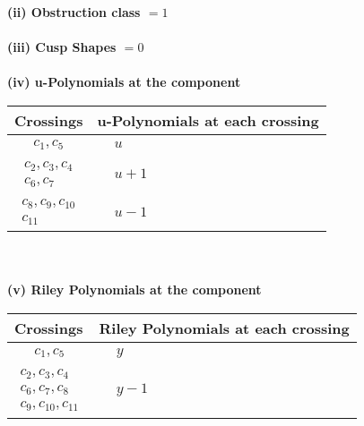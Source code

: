 \documentclass[1p]{elsarticle_modified}
\theoremstyle{definition}
\begin{document}
\flushleft \textbf{(ii) Obstruction class $= 1$}\\~\\
\flushleft \textbf{(iii) Cusp Shapes $= 0$}\\~\\
\newpage\renewcommand{\arraystretch}{1}
\flushleft \textbf{(iv) u-Polynomials at the component}\newline \\
\begin{tabular}{m{50pt}|m{274pt}}
Crossings & \hspace{64pt}u-Polynomials at each crossing \\
\hline $$\begin{aligned}c_{1},c_{5}\end{aligned}$$&$\begin{aligned}
&u
\end{aligned}$\\
\hline $$\begin{aligned}c_{2},c_{3},c_{4}\\c_{6},c_{7}\end{aligned}$$&$\begin{aligned}
&u+1
\end{aligned}$\\
\hline $$\begin{aligned}c_{8},c_{9},c_{10}\\c_{11}\end{aligned}$$&$\begin{aligned}
&u-1
\end{aligned}$\\
\hline
\end{tabular}\\~\\
\newpage\renewcommand{\arraystretch}{1}
\flushleft \textbf{(v) Riley Polynomials at the component}\newline \\
\begin{tabular}{m{50pt}|m{274pt}}
Crossings & \hspace{64pt}Riley Polynomials at each crossing \\
\hline $$\begin{aligned}c_{1},c_{5}\end{aligned}$$&$\begin{aligned}
&y
\end{aligned}$\\
\hline $$\begin{aligned}c_{2},c_{3},c_{4}\\c_{6},c_{7},c_{8}\\c_{9},c_{10},c_{11}\end{aligned}$$&$\begin{aligned}
&y-1
\end{aligned}$\\
\hline
\end{tabular}\\~\\
\end{document}
